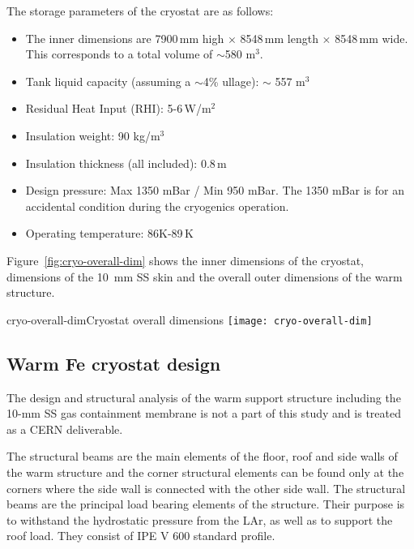 The storage parameters of the cryostat are as follows:
\begin{itemize} %
\item The inner dimensions are 7900\,mm high $\times$ 8548\,mm length $\times$ 8548\,mm wide.  This corresponds to a total volume of $\sim$580 m$^3$. 
\item Tank liquid capacity (assuming a $\sim$4\% ullage): $\sim$ 557 m$^3$
\item Residual Heat Input (RHI): 5-6\,W/m$^2$
\item Insulation weight: 90 kg/m$^3$  
\item Insulation thickness (all included): 0.8\,m 
\item Design pressure: Max 1350 mBar / Min 950 mBar.  The 1350 mBar is for an accidental condition during the cryogenics operation.
\item Operating temperature: 86K-89\,K
\end{itemize}

Figure~\ref{fig:cryo-overall-dim} shows the inner dimensions of the cryostat, dimensions of the \SI{10}{mm} SS skin and the overall outer dimensions of the warm structure.

\begin{cdrfigure}{cryo-overall-dim}{Cryostat overall dimensions}
  \texttt{[image: cryo-overall-dim]}
\end{cdrfigure}

\subsection{Warm Fe cryostat design}


The design and structural analysis of the warm support structure including the 10-mm SS gas containment membrane is not a part of this study and is %
treated as a CERN deliverable. 


The structural beams are the main elements of the floor, roof and side walls of the warm structure and the corner structural elements can be found only at the corners where the side wall is connected with the other side wall. The structural beams are the principal load bearing elements of the structure. Their purpose is to withstand the hydrostatic pressure from the LAr, as well as to support the roof load. They consist of IPE V 600 standard profile. 


